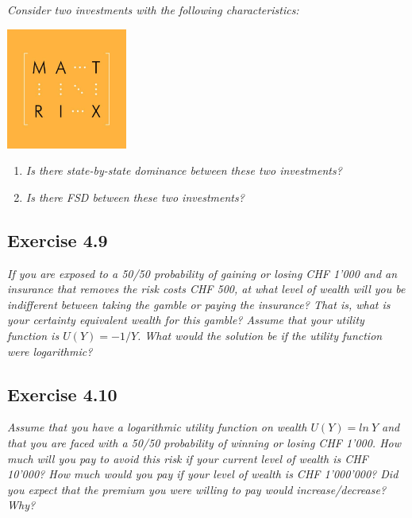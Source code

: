 \documentclass[]{book}
\theoremstyle{definition}
\theoremstyle{definition}
\theoremstyle{remark}
\begin{document}
\emph{Consider two investments with the following characteristics:}
\citep[p.9]{exercises_danthine}

\begin{center}\includegraphics[width=150px]{figures/matrix} \end{center}

\begin{enumerate}
\def\labelenumi{\alph{enumi}.}
\item
  \emph{Is there state-by-state dominance between these two
  investments?} \citep[p.9]{exercises_danthine}
\item
  \emph{Is there FSD between these two investments?}
  \citep[p.9]{exercises_danthine}
\end{enumerate}

\subsection{Exercise 4.9}\label{exercise-4.9}

\emph{If you are exposed to a 50/50 probability of gaining or losing CHF
1'000 and an insurance that removes the risk costs CHF 500, at what
level of wealth will you be indifferent between taking the gamble or
paying the insurance? That is, what is your certainty equivalent wealth
for this gamble? Assume that your utility function is
\(U\left(Y\right)=-1/Y\). What would the solution be if the utility
function were logarithmic?} \citep[p.9]{exercises_danthine}

\subsection{Exercise 4.10}\label{exercise-4.10}

\emph{Assume that you have a logarithmic utility function on wealth
\(U\left(Y\right)=ln \ Y\) and that you are faced with a 50/50
probability of winning or losing CHF 1'000. How much will you pay to
avoid this risk if your current level of wealth is CHF 10'000? How much
would you pay if your level of wealth is CHF 1'000'000? Did you expect
that the premium you were willing to pay would increase/decrease? Why?}
\citep[p.9]{exercises_danthine}
\end{document}
